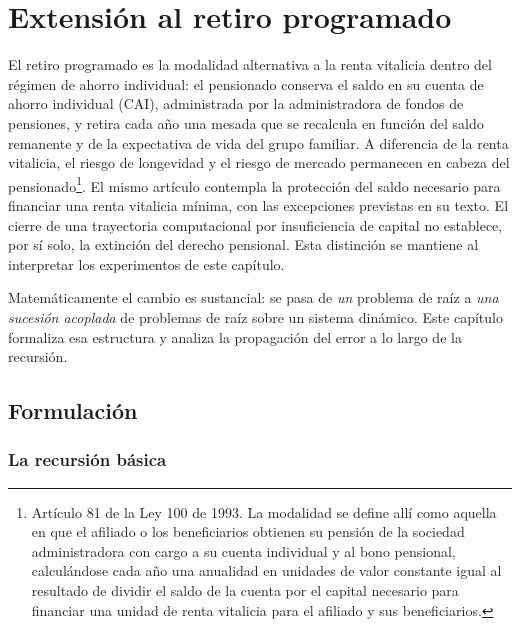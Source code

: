 \chapter{Extensión al retiro programado}
\label{cap:retiro}

El retiro programado es la modalidad alternativa a la renta vitalicia dentro del
régimen de ahorro individual: el pensionado conserva el saldo en su cuenta de
ahorro individual (CAI), administrada por la administradora de fondos de
pensiones, y retira cada año una mesada que se recalcula en función del saldo
remanente y de la expectativa de vida del grupo familiar. A diferencia de la renta
vitalicia, el riesgo de longevidad y el riesgo de mercado permanecen en cabeza del
pensionado\footnote{Artículo 81 de la Ley 100 de 1993. La modalidad se define allí como aquella en que el afiliado o los beneficiarios obtienen su pensión de la sociedad administradora con cargo a su cuenta individual y al bono pensional, calculándose cada año una anualidad en unidades de valor constante igual al resultado de dividir el saldo de la cuenta por el capital necesario para financiar una unidad de renta vitalicia para el afiliado y sus beneficiarios.}.
El mismo artículo contempla la protección del saldo necesario para financiar
una renta vitalicia mínima, con las excepciones previstas en su texto. El
cierre de una trayectoria computacional por insuficiencia de capital no
establece, por sí solo, la extinción del derecho pensional. Esta distinción
se mantiene al interpretar los experimentos de este capítulo.

Matemáticamente el cambio es sustancial: se pasa de \emph{un} problema de raíz a
\emph{una sucesión acoplada} de problemas de raíz sobre un sistema dinámico. Este
capítulo formaliza esa estructura y analiza la propagación del error a lo largo de
la recursión.

\section{Formulación}

\subsection{La recursión básica}

